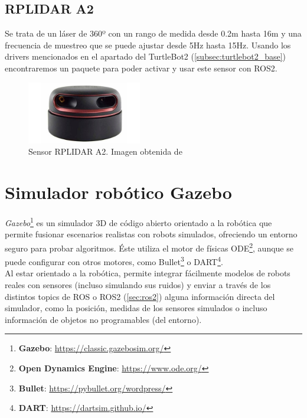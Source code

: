 \subsection{RPLIDAR A2}
\label{subsec:rplidar_a2}

Se trata de un láser de 360º con un rango de medida desde 0.2m hasta 16m y una frecuencia de muestreo que se puede ajustar desde 5Hz hasta 15Hz.
Usando los drivers mencionados en el apartado del TurtleBot2 (\ref{subsec:turtlebot2_base}) encontraremos un paquete para poder activar y usar este sensor con ROS2.\\

\begin{figure} [H]
    \begin{center}
        \includegraphics[width=5cm]{figs/c3/rplidar-a2.jpg}
    \end{center}
    \caption[RPLIDAR A2]{Sensor RPLIDAR A2. Imagen obtenida de \cite{rplidar}}
    \label{fig:rplidar}
\end{figure}

\section{Simulador robótico Gazebo}
\label{sec:gazebo}

\textit{Gazebo}\footnote{\textbf{Gazebo}: \url{https://classic.gazebosim.org/}} es un simulador 3D de código abierto orientado a la robótica que permite
fusionar escenarios realistas con robots simulados, ofreciendo un entorno seguro para probar algoritmos. Éste utiliza el motor de físicas
ODE\footnote{\textbf{Open Dynamics Engine}: \url{https://www.ode.org/}}, aunque se puede configurar con otros motores, como
Bullet\footnote{\textbf{Bullet}: \url{https://pybullet.org/wordpress/}} o DART\footnote{\textbf{DART}: \url{https://dartsim.github.io/}}.\\

Al estar orientado a la robótica, permite integrar fácilmente modelos de robots reales con sensores (incluso simulando sus ruidos) y enviar a través
de los distintos topics de ROS o ROS2 (\ref{sec:ros2}) alguna información directa del simulador, como la posición, medidas de los sensores simulados o
incluso información de objetos no programables (del entorno).\\

